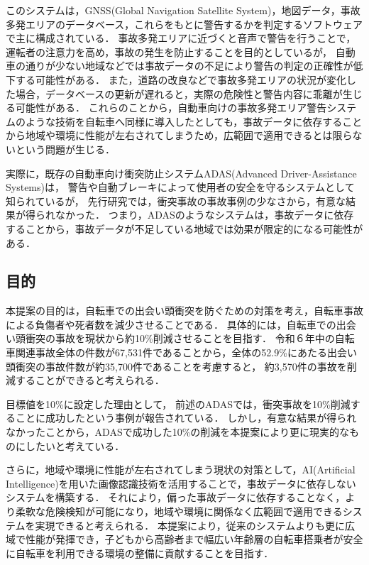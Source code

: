 \documentclass[uplatex,dvipdfmx]{jsarticle}
\begin{document}
このシステムは，GNSS(Global Navigation Satellite System)，地図データ，事故多発エリアのデータベース，これらをもとに警告するかを判定するソフトウェアで主に構成されている．
事故多発エリアに近づくと音声で警告を行うことで，運転者の注意力を高め，事故の発生を防止することを目的としているが，
自動車の通りが少ない地域などでは事故データの不足により警告の判定の正確性が低下する可能性がある．
また，道路の改良などで事故多発エリアの状況が変化した場合，データベースの更新が遅れると，実際の危険性と警告内容に乖離が生じる可能性がある．
これらのことから，自動車向けの事故多発エリア警告システムのような技術を自転車へ同様に導入したとしても，事故データに依存することから地域や環境に性能が左右されてしまうため，広範囲で適用できるとは限らないという問題が生じる．

実際に，既存の自動車向け衝突防止システムADAS(Advanced Driver-Assistance Systems)は，
警告や自動ブレーキによって使用者の安全を守るシステムとして知られているが，
先行研究では，衝突事故の事故事例の少なさから，有意な結果が得られなかった\cite{ref:adas}．
つまり，ADASのようなシステムは，事故データに依存することから，事故データが不足している地域では効果が限定的になる可能性がある．

\subsection{目的}
本提案の目的は，自転車での出会い頭衝突を防ぐための対策を考え，自転車事故による負傷者や死者数を減少させることである．
具体的には，自転車での出会い頭衝突の事故を現状から約10\%削減させることを目指す．
令和６年中の自転車関連事故全体の件数が67,531件であることから，全体の52.9\%にあたる出会い頭衝突の事故件数が約35,700件であることを考慮すると，
約3,570件の事故を削減することができると考えられる．

目標値を10\%に設定した理由として，
前述のADASでは，衝突事故を10\%削減することに成功したという事例が報告されている\cite{ref:adas_purpose}．
しかし，有意な結果が得られなかったことから，ADASで成功した10\%の削減を本提案により更に現実的なものにしたいと考えている．

さらに，地域や環境に性能が左右されてしまう現状の対策として，AI(Artificial Intelligence)を用いた画像認識技術を活用することで，事故データに依存しないシステムを構築する．
それにより，偏った事故データに依存することなく，より柔軟な危険検知が可能になり，地域や環境に関係なく広範囲で適用できるシステムを実現できると考えられる．
本提案により，従来のシステムよりも更に広域で性能が発揮でき，子どもから高齢者まで幅広い年齢層の自転車搭乗者が安全に自転車を利用できる環境の整備に貢献することを目指す．
\end{document}
